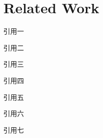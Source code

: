 \chapter{Related Work}

引用一\citet{Wang2004}

引用二\citet[chap. 2]{Wang2004}

引用三\citep{Wang2004}

引用四\citep[chap. 2]{Wang2004}

引用五\citep[see][]{Wang2004}

引用六\citep[see][chap. 2]{Wang2004}

引用七\citet*{Wang2004}


\cite{PubMed}

\cite{LiFei2011}
